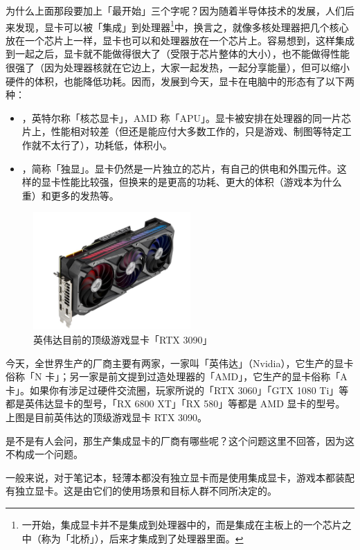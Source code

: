 为什么上面那段要加上「最开始」三个字呢？因为随着半导体技术的发展，人们后来发现，显卡可以被「集成」到处理器\footnote{一开始，集成显卡并不是集成到处理器中的，而是集成在主板上的一个芯片之中（称为「北桥」），后来才集成到了处理器里面。}中，换言之，就像多核处理器把几个核心放在一个芯片上一样，显卡也可以和处理器放在一个芯片上。容易想到，这样集成到一起之后，显卡就不能做得很大了（受限于芯片整体的大小），也不能做得性能很强了（因为处理器核就在它边上，大家一起发热，一起分享能量），但可以缩小硬件的体积，也能降低功耗。因而，发展到今天，显卡在电脑中的形态有了以下两种：

\begin{itemize}
  \item {}，英特尔称「核芯显卡」，AMD 称「APU」。显卡被安排在处理器的同一片芯片上，性能相对较差（但还是能应付大多数工作的，只是游戏、制图等特定工作就不太行了），功耗低，体积小。
  \item {}，简称「独显」。显卡仍然是一片独立的芯片，有自己的供电和外围元件。这样的显卡性能比较强，但换来的是更高的功耗、更大的体积（游戏本为什么重）和更多的发热等。
\end{itemize}

\begin{figure}[H]
  \centering
  \includegraphics[width=6cm]{assets/3090.png}
  \caption{英伟达目前的顶级游戏显卡「RTX 3090」}
  \label{3090-gpu}
\end{figure}

今天，全世界生产的厂商主要有两家，一家叫「英伟达」（Nvidia），它生产的显卡俗称「N 卡」；另一家是前文提到过造处理器的「AMD」，它生产的显卡俗称「A 卡」。如果你有涉足过硬件交流圈，玩家所说的「RTX 3060」「GTX 1080 Ti」等都是英伟达显卡的型号，「RX 6800 XT」「RX 580」等都是 AMD 显卡的型号。上图是目前英伟达的顶级游戏显卡 RTX 3090。

\begin{note}
  是不是有人会问，那生产集成显卡的厂商有哪些呢？这个问题这里不回答，因为这不构成一个问题。
\end{note}


一般来说，对于笔记本，轻薄本都没有独立显卡而是使用集成显卡，游戏本都装配有独立显卡。这是由它们的使用场景和目标人群不同所决定的。

